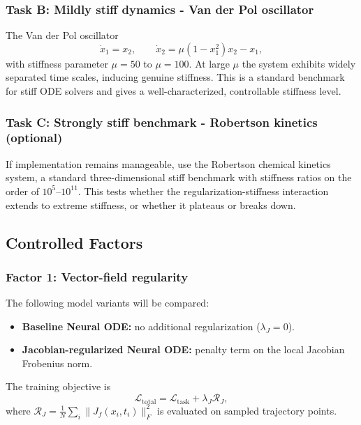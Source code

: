 \documentclass[11pt]{article}
\begin{document}
\subsubsection{Task B: Mildly stiff dynamics - Van der Pol oscillator}
The Van der Pol oscillator
\begin{equation}
\dot{x}_1 = x_2, \qquad \dot{x}_2 = \mu(1 - x_1^2)x_2 - x_1,
\end{equation}
with stiffness parameter $\mu = 50$ to $\mu = 100$. At large $\mu$ the system exhibits widely separated time scales, inducing genuine stiffness. This is a standard benchmark for stiff ODE solvers and gives a well-characterized, controllable stiffness level.

\subsubsection{Task C: Strongly stiff benchmark - Robertson kinetics (optional)}
If implementation remains manageable, use the Robertson chemical kinetics system, a standard three-dimensional stiff benchmark with stiffness ratios on the order of $10^5$--$10^{11}$. This tests whether the regularization-stiffness interaction extends to extreme stiffness, or whether it plateaus or breaks down.

\subsection{Controlled Factors}

\subsubsection{Factor 1: Vector-field regularity}
The following model variants will be compared:
\begin{itemize}[leftmargin=2em]
    \item \textbf{Baseline Neural ODE:} no additional regularization ($\lambda_J = 0$).
    \item \textbf{Jacobian-regularized Neural ODE:} penalty term on the local Jacobian Frobenius norm.
\end{itemize}
The training objective is
\begin{equation}
\mathcal{L}_{\text{total}} = \mathcal{L}_{\text{task}} + \lambda_J \mathcal{R}_J,
\end{equation}
where $\mathcal{R}_J = \frac{1}{N}\sum_i \|J_f(x_i, t_i)\|_F^2$ is evaluated on sampled trajectory points.
\end{document}
